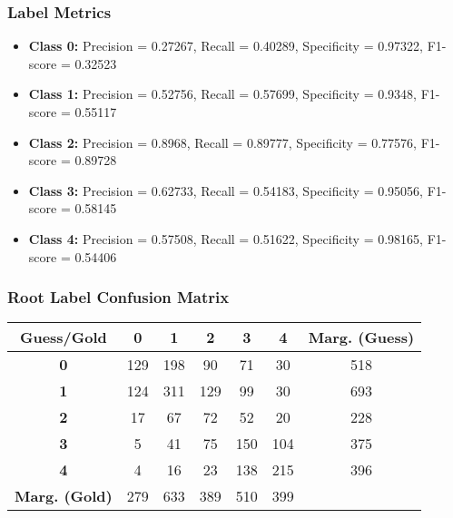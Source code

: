 \subsubsection{Label Metrics}
\begin{itemize}
	\item \textbf{Class 0:} Precision = 0.27267, Recall =   0.40289, Specificity = 0.97322, F1-score = 0.32523
	\item \textbf{Class 1:} Precision = 0.52756, Recall =   0.57699, Specificity = 0.9348,  F1-score = 0.55117
	\item \textbf{Class 2:} Precision = 0.8968,  Recall =   0.89777, Specificity = 0.77576, F1-score = 0.89728
	\item \textbf{Class 3:} Precision = 0.62733, Recall =   0.54183, Specificity = 0.95056, F1-score = 0.58145
	\item \textbf{Class 4:} Precision = 0.57508, Recall =   0.51622, Specificity = 0.98165, F1-score = 0.54406
\end{itemize}

\subsubsection{Root Label Confusion Matrix}
\begin{table}[h]
	\centering
	\begin{tabular}{c|ccccc|c}
		\textbf{Guess/Gold}   & \textbf{0} & \textbf{1} & \textbf{2} & \textbf{3} & \textbf{4} & \textbf{Marg. (Guess)} \\
		\hline
		\textbf{0}            & 129        & 198        & 90         & 71         & 30         & 518                    \\
		\textbf{1}            & 124        & 311        & 129        & 99         & 30         & 693                    \\
		\textbf{2}            & 17         & 67         & 72         & 52         & 20         & 228                    \\
		\textbf{3}            & 5          & 41         & 75         & 150        & 104        & 375                    \\
		\textbf{4}            & 4          & 16         & 23         & 138        & 215        & 396                    \\
		\hline
		\textbf{Marg. (Gold)} & 279        & 633        & 389        & 510        & 399        &                        \\
	\end{tabular}
\end{table}

